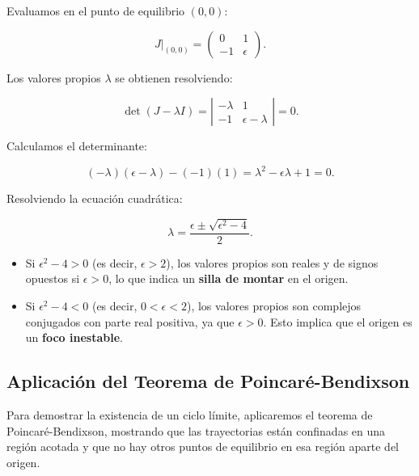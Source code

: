 \documentclass[12pt, a4paper]{report}
\begin{document}
Evaluamos en el punto de equilibrio \((0, 0)\):

\begin{equation}
    J|_{(0,0)} =
    \begin{pmatrix}
        0 & 1 \\
        -1 & \epsilon
    \end{pmatrix}.
\end{equation}

Los valores propios \(\lambda\) se obtienen resolviendo:

\begin{equation}
    \det(J - \lambda I) = \left| \begin{array}{cc}
        -\lambda & 1 \\
        -1 & \epsilon - \lambda
    \end{array} \right| = 0.
\end{equation}

Calculamos el determinante:

\begin{equation}
    (-\lambda)(\epsilon - \lambda) - (-1)(1) = \lambda^2 - \epsilon \lambda + 1 = 0.
\end{equation}

Resolviendo la ecuación cuadrática:

\begin{equation}
    \lambda = \dfrac{\epsilon \pm \sqrt{\epsilon^2 - 4}}{2}.
\end{equation}

\begin{itemize}
    \item Si \(\epsilon^2 - 4 > 0\) (es decir, \(\epsilon > 2\)), los valores propios son reales y de signos opuestos si \(\epsilon > 0\), lo que indica un \textbf{silla de montar} en el origen.
    \item Si \(\epsilon^2 - 4 < 0\) (es decir, \(0 < \epsilon < 2\)), los valores propios son complejos conjugados con parte real positiva, ya que \(\epsilon > 0\). Esto implica que el origen es un \textbf{foco inestable}.
\end{itemize}

\subsection*{Aplicación del Teorema de Poincaré-Bendixson}

Para demostrar la existencia de un ciclo límite, aplicaremos el teorema de Poincaré-Bendixson, mostrando que las trayectorias están confinadas en una región acotada y que no hay otros puntos de equilibrio en esa región aparte del origen.
\end{document}
